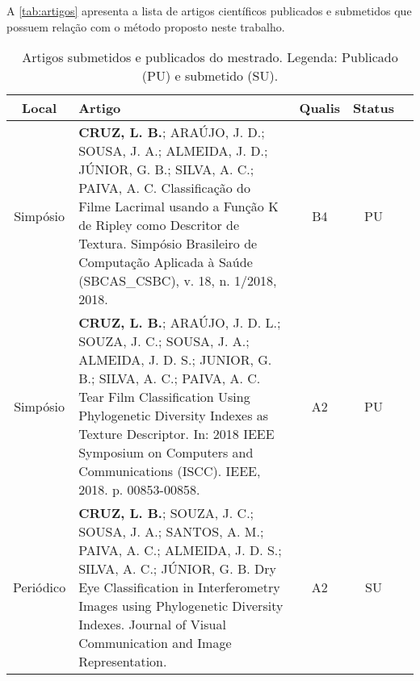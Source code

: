 A \autoref{tab:artigos} apresenta a lista de artigos científicos publicados e submetidos que possuem relação com o método proposto neste trabalho.

\begin{table}[!ht]
\centering
{}
\caption{Artigos submetidos e publicados do mestrado. Legenda: Publicado (PU) e submetido (SU).}
\label{tab:artigos}
\begin{tabular}{cp{10cm}ccc}
\hline
\textbf{Local} & \centering \textbf{Artigo} & \textbf{Qualis} & \textbf{Status} \\ \hline \hline
Simpósio & \textbf{CRUZ, L. B.}; ARAÚJO, J. D.; SOUSA, J. A.; ALMEIDA, J. D.; JÚNIOR, G. B.; SILVA, A. C.; PAIVA, A. C. Classificação do Filme Lacrimal usando a Função K de Ripley como Descritor de Textura. Simpósio Brasileiro de Computação Aplicada à Saúde (SBCAS\_CSBC), v. 18, n. 1/2018, 2018. & B4 & PU \\
Simpósio & \textbf{CRUZ, L. B.}; ARAÚJO, J. D. L.; SOUZA, J. C.; SOUSA, J. A.; ALMEIDA, J. D. S.; JUNIOR, G. B.; SILVA, A. C.; PAIVA, A. C. Tear Film Classification Using Phylogenetic Diversity Indexes as Texture Descriptor. In: 2018 IEEE Symposium on Computers and Communications (ISCC). IEEE, 2018. p. 00853-00858. & A2 & PU \\
Periódico & \textbf{CRUZ, L. B.}; SOUZA, J. C.; SOUSA, J. A.; SANTOS, A. M.; PAIVA, A. C.; ALMEIDA, J. D. S.; SILVA, A. C.; JÚNIOR, G. B. Dry Eye Classification in Interferometry Images using Phylogenetic Diversity Indexes. Journal of Visual Communication and Image Representation. & A2 & SU \\ \hline
\end{tabular}
\end{table}
